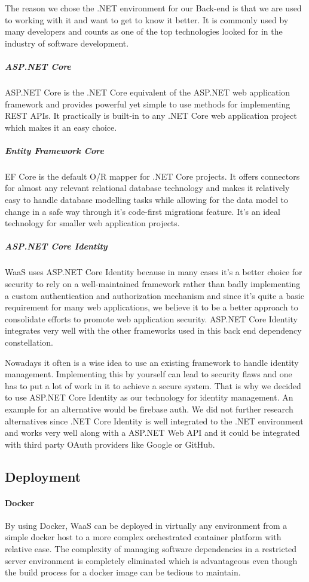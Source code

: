 \documentclass[titlepage, 12pt]{article}
\begin{document}
The reason we chose the .NET environment for our Back-end is that we are used to working with it and want to get to know it better. It is commonly used by many developers and counts as one of the top technologies looked for in the industry of software development.

\subparagraph{ASP.NET Core}
ASP.NET Core is the .NET Core equivalent of the ASP.NET web application framework and provides powerful yet simple to use methods for implementing REST APIs. It practically is built-in to any
.NET Core web application project which makes it an easy choice.

\subparagraph{Entity Framework Core}
EF Core is the default O/R mapper for .NET Core projects. It offers connectors for almost any relevant relational database technology and makes it relatively easy to handle database modelling tasks
while allowing for the data model to change in a safe way through it's code-first migrations feature. It's an ideal technology for smaller web application projects.

\subparagraph{ASP.NET Core Identity}
WaaS uses ASP.NET Core Identity because in many cases it's a better choice for security to rely on a well-maintained framework rather than badly implementing a custom authentication and authorization mechanism and
since it's quite a basic requirement for many web applications, we believe it to be a better approach to consolidate efforts to promote web application security. ASP.NET Core Identity integrates very well with the other
frameworks used in this back end dependency constellation.

Nowadays it often is a wise idea to use an existing framework to handle identity management. Implementing this by yourself can lead to security flaws and one has to put a lot of work in it to achieve a secure system. That is why we decided to use ASP.NET Core Identity as our technology for identity management. An example for an alternative would be firebase auth. We did not further research alternatives since .NET Core Identity is well integrated to the .NET environment and works very well along with a ASP.NET Web API and it could be integrated with third party OAuth providers like Google or GitHub.

\subsection{Deployment}

\paragraph{Docker}
By using Docker, WaaS can be deployed in virtually any environment from a simple docker host to a more complex orchestrated container platform with relative ease.
The complexity of managing software dependencies in a restricted server environment is completely eliminated which is advantageous
even though the build process for a docker image can be tedious to maintain.
\end{document}
